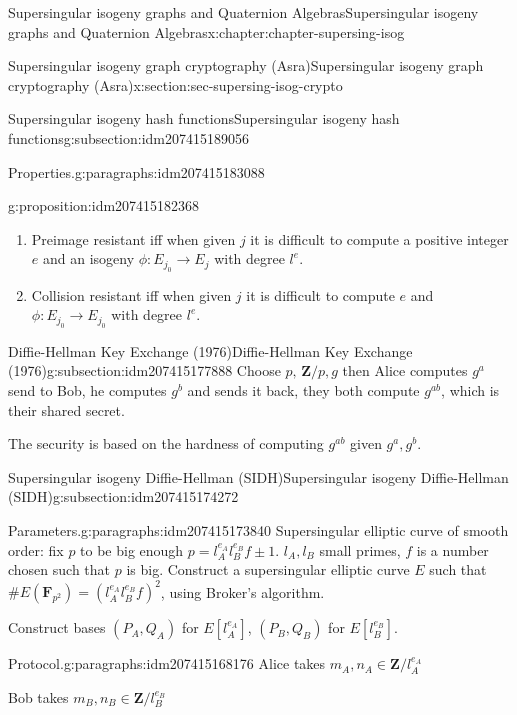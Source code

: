 \documentclass[oneside,10pt,]{book}
\numberwithin{equation}{section}
\newcommand{\lb}{[}
\newcommand{\rb}{]}
\newcommand{\ZZ}{\mathbf{Z}}
\newcommand{\FF}{\mathbf{F}}
\begin{document}
\begin{chapterptx}{Supersingular isogeny graphs and Quaternion Algebras}{}{Supersingular isogeny graphs and Quaternion Algebras}{}{}{x:chapter:chapter-supersing-isog}
\begin{sectionptx}{Supersingular isogeny graph cryptography (Asra)}{}{Supersingular isogeny graph cryptography (Asra)}{}{}{x:section:sec-supersing-isog-crypto}
\begin{subsectionptx}{Supersingular isogeny hash functions}{}{Supersingular isogeny hash functions}{}{}{g:subsection:idm207415189056}
\begin{paragraphs}{Properties.}{g:paragraphs:idm207415183088}
\begin{proposition}{}{}{g:proposition:idm207415182368}
\begin{enumerate}
\item{}Preimage resistant iff when given \(j\) it is difficult to compute a positive integer \(e\) and an isogeny \(\phi\colon E_{j_0} \to E_j\) with degree \(l^e\).%
\item{}Collision resistant iff when given \(j\) it is difficult to compute \(e\) and  \(\phi \colon E_{j_0} \to E_{j_0}\) with degree \(l^e\).%
\end{enumerate}
%
\end{proposition}
\end{paragraphs}%
\end{subsectionptx}
%
%
\typeout{************************************************}
\typeout{************************************************}
%
\begin{subsectionptx}{Diffie-Hellman Key Exchange (1976)}{}{Diffie-Hellman Key Exchange (1976)}{}{}{g:subsection:idm207415177888}
Choose \(p,\, \ZZ/p, g\) then Alice computes \(g^a\) send to Bob, he computes \(g^b\) and sends it back, they both compute \(g^{ab}\), which is their shared secret.%
\par
The security is based on the hardness of computing \(g^{ab}\) given \(g^a,g^b\).%
\end{subsectionptx}
%
%
\typeout{************************************************}
\typeout{************************************************}
%
\begin{subsectionptx}{Supersingular isogeny Diffie-Hellman (SIDH)}{}{Supersingular isogeny Diffie-Hellman (SIDH)}{}{}{g:subsection:idm207415174272}
\begin{paragraphs}{Parameters.}{g:paragraphs:idm207415173840}%
Supersingular elliptic curve of smooth order: fix \(p\) to be big enough \(p = l_A^{e_A} l_B^{e_B} f  \pm 1\). \(l_A,l_B\) small primes, \(f\) is a number chosen such that \(p\) is big. Construct a supersingular elliptic curve \(E\) such that \(\# E(\FF_{p^2}) = (l_A^{e_A}l_B^{e_B} f)^2\), using Broker's algorithm.%
\par
Construct bases \((P_A, Q_A)\) for \(E\lb l_A^{e_A}\rb\), \((P_B, Q_B)\) for \(E\lb l_B^{e_B}\rb\).%
\end{paragraphs}%
\begin{paragraphs}{Protocol.}{g:paragraphs:idm207415168176}%
Alice takes \(m_A,n_A \in \ZZ/l_A^{e_A}\)%
\par
Bob takes \(m_B,n_B \in \ZZ/l_B^{e_B}\)%
\par

\end{paragraphs}
\end{subsectionptx}
\end{sectionptx}
\end{chapterptx}
\end{document}
